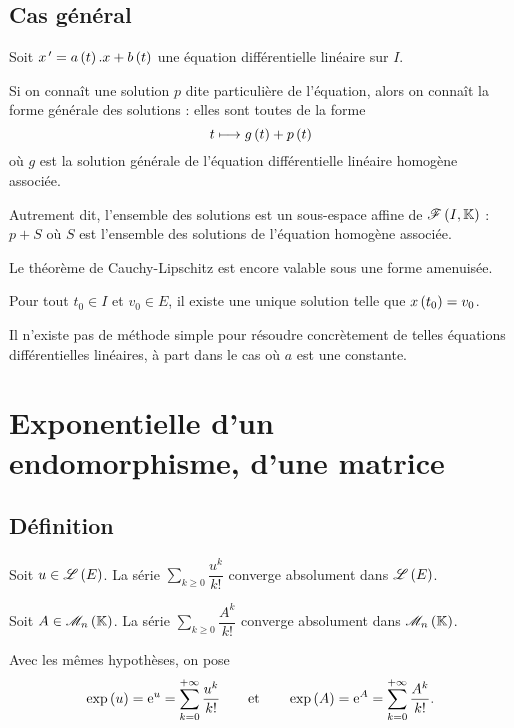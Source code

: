 \subsection{Cas général}

\begin{prop}
Soit \(x^{\,\prime}=a\left(t\right).x+b\left(t\right)\) une équation différentielle linéaire sur \(I\).

Si on connaît une solution \(p\) dite particulière de l'équation, alors on connaît la forme générale des solutions : elles sont toutes de la forme \[t\longmapsto g\left(t\right)+p\left(t\right)\] où \(g\) est la solution générale de l'équation différentielle linéaire homogène associée.

Autrement dit, l'ensemble des solutions est un sous-espace affine de \(\mathscr{F}\left(I,\mathbb{K}\right)\) : \(p+S\) où \(S\) est l'ensemble des solutions de l'équation homogène associée.
\end{prop}

Le théorème de Cauchy-Lipschitz est encore valable sous une forme amenuisée.

\begin{theo}
Pour tout \(t_0\in I\) et \(v_0\in E\), il existe une unique solution telle que \(x\left(t_0\right)=v_0\).
\end{theo}

\begin{rem}
Il n'existe pas de méthode simple pour résoudre concrètement de telles équations différentielles linéaires, à part dans le cas où \(a\) est une constante.
\end{rem}

\section{Exponentielle d'un endomorphisme, d'une matrice}

\subsection{Définition}

\begin{prop}
Soit \(u\in\mathscr{L}\left(E\right)\). La série \(\sum_{k\geq0}\dfrac{u^k}{k!}\) converge absolument dans \(\mathscr{L}\left(E\right)\).

Soit \(A\in\M{n}\). La série \(\sum_{k\geq0}\dfrac{A^k}{k!}\) converge absolument dans \(\M{n}\).
\end{prop}

\begin{defi}
Avec les mêmes hypothèses, on pose \[\exp\left(u\right)=\mathrm{e}^{u}=\sum_{k=0}^{+\infty}\dfrac{u^k}{k!}\qquad\text{et}\qquad\exp\left(A\right)=\mathrm{e}^{A}=\sum_{k=0}^{+\infty}\dfrac{A^k}{k!}.\]
\end{defi}

